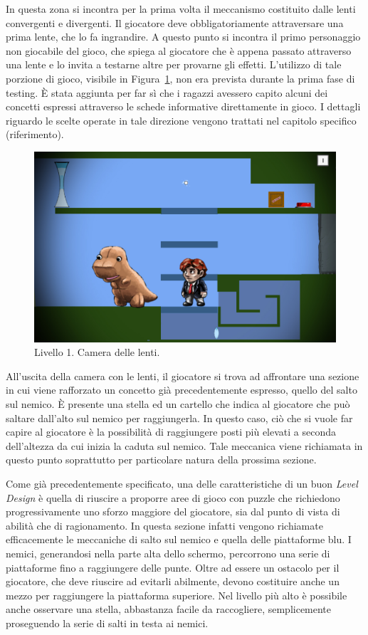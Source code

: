 In questa zona si incontra per la prima volta il meccanismo costituito dalle lenti convergenti e divergenti. Il giocatore deve obbligatoriamente attraversare una prima lente, che lo fa ingrandire. A questo punto si incontra il primo personaggio non giocabile del gioco, che spiega al giocatore che è appena passato attraverso una lente e lo invita a testarne altre per provarne gli effetti. L’utilizzo di tale porzione di gioco, visibile in Figura~\ref{fig:livello1_camera_lenti}, non era prevista durante la prima fase di testing. È stata aggiunta per far sì che i ragazzi avessero capito alcuni dei concetti espressi attraverso le schede informative direttamente in gioco. I dettagli riguardo le scelte operate in tale direzione vengono trattati nel capitolo specifico (riferimento).

\begin{figure}%
	\centering
	\includegraphics[width= 0.75\columnwidth]{images/gameDesign/46_camera_lenti.jpg}
	\caption{Livello 1. Camera delle lenti.}
	\label{fig:livello1_camera_lenti}
\end{figure}

All’uscita della camera con le lenti, il giocatore si trova ad affrontare una sezione in cui viene rafforzato un concetto già precedentemente espresso, quello del salto sul nemico. È presente una stella ed un cartello che indica al giocatore che può saltare dall’alto sul nemico per raggiungerla. In questo caso, ciò che si vuole far capire al giocatore è la possibilità di raggiungere posti più elevati a seconda dell’altezza da cui inizia la caduta sul nemico.
Tale meccanica viene richiamata in questo punto soprattutto per particolare natura della prossima sezione.

Come già precedentemente specificato, una delle caratteristiche di un buon \textit{Level Design} è quella di riuscire a proporre aree di gioco con puzzle che richiedono progressivamente uno sforzo maggiore del giocatore, sia dal punto di vista di abilità che di ragionamento. In questa sezione infatti vengono richiamate efficacemente le meccaniche di salto sul nemico e quella delle piattaforme blu. I nemici, generandosi nella parte alta dello schermo, percorrono una serie di piattaforme fino a raggiungere delle punte. Oltre ad essere un ostacolo per il giocatore, che deve riuscire ad evitarli abilmente, devono costituire anche un mezzo per raggiungere la piattaforma superiore. Nel livello più alto è possibile anche osservare una stella, abbastanza facile da raccogliere, semplicemente proseguendo la serie di salti in testa ai nemici.

